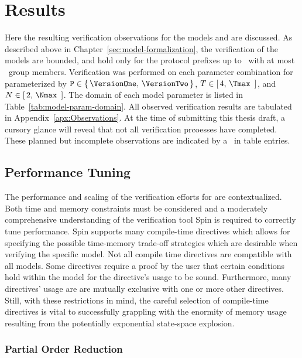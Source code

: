 \hypertarget{sec:results}{%
\chapter{Results}\label{sec:results}}

Here the resulting verification observations for the models \CGKAmod{\VersionOne}{}{} and \CGKAmod{\VersionTwo}{}{} are discussed.
As described above in Chapter\ \ref{sec:model-formalization}, the verification of the models are bounded, and hold only for the protocol prefixes up to \Tmax\ with at most \Nmax\ group members.
Verification was performed on each parameter combination for  parameterized by \( \mathtt{P} \in \{\,\VersionOne,\, \VersionTwo\,\} \), \( T \in [\,4,\, \Tmax\ \,] \), and \( N \in [\,2,\, \Nmax\ \,] \).
The domain of each  model parameter is listed in Table\ \ref{tab:model-param-domain}.
All observed verification results are tabulated in Appendix\ \ref{apx:Observations}.
At the time of submitting this thesis draft, a cursory glance will reveal that not all verification prcoesses have completed.
These planned but incomplete observations are indicated by a \NA\ in table entries.


\hypertarget{performance-tuning}{%
\section{Performance Tuning}\label{performance-tuning}}

The performance and scaling of the verification efforts for \CGKAmod{}{}{} are contextualized.
Both time and memory constraints must be considered and a moderately comprehensive understanding of the verification tool Spin is required to correctly tune performance.
Spin supports many compile-time directives which allows for specifying the possible time-memory trade-off strategies which are desirable when verifying the specific model.
Not all compile time directives are compatible with all models.
Some directives require a proof by the user that certain conditions hold within the model for the directive's usage to be sound.
Furthermore, many directives' usage are are mutually exclusive with one or more other directives.
Still, with these restrictions in mind, the careful selection of compile-time directives is vital to successfully grappling with the enormity of memory usage resulting from the potentially exponential state-space explosion.


\hypertarget{sec:partial-order-reduction}{%
\subsection{Partial Order Reduction}\label{sec:partial-order-reduction}}

